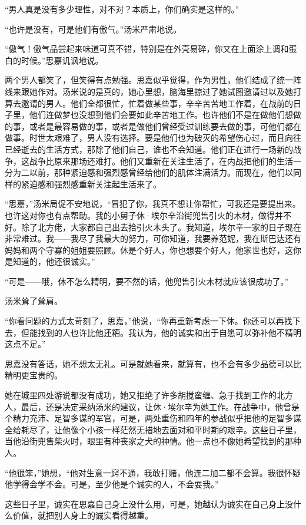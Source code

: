 \par “男人真是没有多少理性，对不对？本质上，你们确实是这样的。”
\par “也许是没有，可是他们有傲气。”汤米严肃地说。
\par “傲气！傲气品尝起来味道可真不错，特别是在外壳易碎，你又在上面涂上调和蛋白的时候。”思嘉讥讽地说。
\par 两个男人都笑了，但笑得有点勉强。思嘉似乎觉得，作为男性，他们结成了统一阵线来跟她作对。汤米说的是真的，她心里想，脑海里掠过了她试图邀请过以及她打算去邀请的男人。他们全都很忙，忙着做某些事，辛辛苦苦地工作着，在战前的日子里，他们连做梦也没想到他们会要如此辛苦地工作。也许他们不是在做他们想做的事，或者是最容易做的事，或者是做他们曾经受过训练要去做的事，可他们都在做事。时世太艰难了，男人没有选择。要是他们也为破灭的希望伤心过，而且向往已经逝去的生活方式，那除了他们自己，谁也不会知道。他们正在进行一场新的战争，这战争比原来那场还难打。他们又重新在关注生活了，在内战把他们的生活一分为二以前，那种紧迫感和强烈感曾经给他们的肌体注满活力。而现在，他们以同样的紧迫感和强烈感重新关注起生活来了。
\par “思嘉，”汤米局促不安地说，“冒犯了你，我真不想让你帮忙，可我还是要提出来。也许这对你也有点帮助。我的小舅子休·埃尔辛沿街兜售引火的木材，做得并不好。除了北方佬，大家都自己出去拾引火木头了。我知道，埃尔辛一家的日子现在非常难过。我——我尽了我最大的努力，可你知道，我要养范妮，我在斯巴达还有妈妈和两个守寡的姐姐要照顾。休是个好人，你也想要个好人，他家世也好，这你是知道的，他还很诚实。”
\par “可是——哦，休不怎么精明，要不然的话，他兜售引火木材就应该很成功了。”
\par 汤米耸了耸肩。
\par “你看问题的方式太苛刻了，思嘉，”他说，“你再重新考虑一下休。你还可以再找下去，但能找到的人也许比他还糟。我认为，他的诚实和出于自愿可以弥补他不精明这点不足。”
\par 思嘉没有答话，她不想太无礼。可是就她看来，就算有，也不会有多少品德可以比精明更宝贵的。
\par 她在城里四处游说都没有成功，她又拒绝了许多胡搅蛮缠、急于找到工作的北方人，最后，还是决定采纳汤米的建议，让休·埃尔辛为她工作。在战争中，他曾是个精力充沛、足智多谋的军官，可是，两处重伤和四年的参战似乎把他的足智多谋全给耗尽了，让他像个小孩一样茫然无措地去面对和平时期的艰辛。这些日子里，当他沿街兜售柴火时，眼里有种丧家之犬的神情。他一点也不像她希望找到的那种人。
\par “他很笨，”她想，“他对生意一窍不通，我敢打赌，他连二加二都不会算。我很怀疑他学得会学不会。可是，至少他是个诚实的人，不会耍我。”
\par 这些日子里，诚实在思嘉自己身上没什么用，可是，她越认为诚实在自己身上没什么价值，就把别人身上的诚实看得越重。
